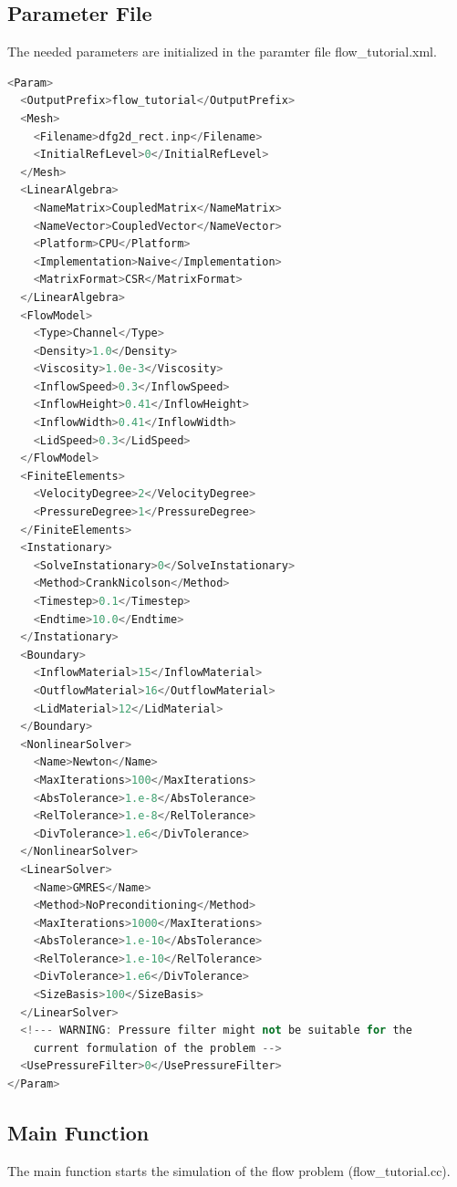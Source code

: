\documentclass[a4paper, 11pt, twoside]{article}
\begin{document}
\subsection{Parameter File}\label{sectionparameter file}
The needed parameters are initialized in the paramter file flow\_tutorial.xml.
\begin{lstlisting}[language=C++, basicstyle={\footnotesize, \ttfamily}, keywordstyle=\color{blue}, numbers=none, tabsize=4]
<Param>
  <OutputPrefix>flow_tutorial</OutputPrefix>
  <Mesh>
    <Filename>dfg2d_rect.inp</Filename>
    <InitialRefLevel>0</InitialRefLevel>
  </Mesh>
  <LinearAlgebra>
    <NameMatrix>CoupledMatrix</NameMatrix>
    <NameVector>CoupledVector</NameVector>
    <Platform>CPU</Platform>
    <Implementation>Naive</Implementation>
    <MatrixFormat>CSR</MatrixFormat>
  </LinearAlgebra>
  <FlowModel>
    <Type>Channel</Type>
    <Density>1.0</Density>
    <Viscosity>1.0e-3</Viscosity>
    <InflowSpeed>0.3</InflowSpeed>
    <InflowHeight>0.41</InflowHeight>
    <InflowWidth>0.41</InflowWidth>
    <LidSpeed>0.3</LidSpeed>
  </FlowModel>
  <FiniteElements>
    <VelocityDegree>2</VelocityDegree>
    <PressureDegree>1</PressureDegree>
  </FiniteElements>
  <Instationary>
    <SolveInstationary>0</SolveInstationary>
    <Method>CrankNicolson</Method>
    <Timestep>0.1</Timestep>
    <Endtime>10.0</Endtime>
  </Instationary>
  <Boundary>
    <InflowMaterial>15</InflowMaterial>
    <OutflowMaterial>16</OutflowMaterial>
    <LidMaterial>12</LidMaterial>
  </Boundary>
  <NonlinearSolver>
    <Name>Newton</Name>
    <MaxIterations>100</MaxIterations>
    <AbsTolerance>1.e-8</AbsTolerance>
    <RelTolerance>1.e-8</RelTolerance>
    <DivTolerance>1.e6</DivTolerance>
  </NonlinearSolver>
  <LinearSolver>
    <Name>GMRES</Name>
    <Method>NoPreconditioning</Method>
    <MaxIterations>1000</MaxIterations>
    <AbsTolerance>1.e-10</AbsTolerance>
    <RelTolerance>1.e-10</RelTolerance>
    <DivTolerance>1.e6</DivTolerance>
    <SizeBasis>100</SizeBasis>
  </LinearSolver>
  <!--- WARNING: Pressure filter might not be suitable for the 
  	current formulation of the problem -->
  <UsePressureFilter>0</UsePressureFilter>
</Param>

\end{lstlisting}

\subsection{Main Function}\label{main}
The main function starts the simulation of the flow problem (flow\_tutorial.cc).
\end{document}
